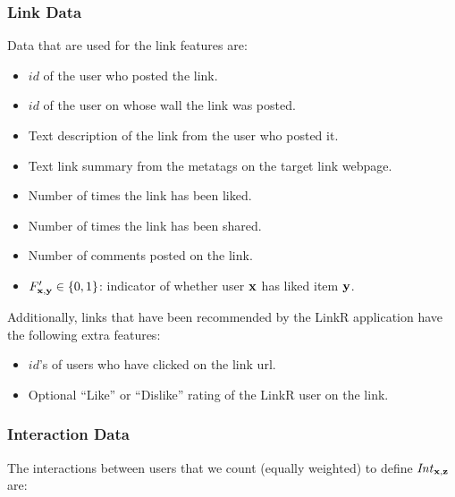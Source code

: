 \subsubsection{Link Data}

Data that are used for the link features are:
\begin{itemize}
\item{$\mathit{id}$ of the user who posted the link.}
\item{$\mathit{id}$ of the user on whose wall the link was posted.}
\item{Text description of the link from the user who posted it.}
\item{Text link summary from the metatags on the target link webpage.}
\item{Number of times the link has been liked.}
\item{Number of times the link has been shared.}
\item{Number of comments posted on the link}.
\item {$F'_{\mathbf{x},\mathbf{y}} \in \{0, 1\}$:} indicator of whether user $\mathbf{x}$ has liked item $\mathbf{y}$.
\end{itemize}
Additionally, links that have been recommended by the LinkR
application have the following extra features:
\begin{itemize}
\item{$\mathit{id}$'s of users who have clicked on the link url.}
\item{Optional ``Like'' or ``Dislike'' rating of the LinkR user on the link.}
\end{itemize}

\subsubsection{Interaction Data}
\label{sec:interactions}

The interactions between users that we count (equally weighted) to define
$\mathit{Int}_{\mathbf{x},\mathbf{z}}$ are:

